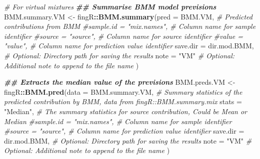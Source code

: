 \documentclass[
]{article}
\newenvironment{Shaded}{\begin{snugshade}}{\end{snugshade}}
\newcommand{\AttributeTok}[1]{\textcolor[rgb]{0.13,0.29,0.53}{#1}}
\newcommand{\CommentTok}[1]{\textcolor[rgb]{0.56,0.35,0.01}{\textit{#1}}}
\newcommand{\DocumentationTok}[1]{\textcolor[rgb]{0.56,0.35,0.01}{\textbf{\textit{#1}}}}
\newcommand{\FunctionTok}[1]{\textcolor[rgb]{0.13,0.29,0.53}{\textbf{#1}}}
\newcommand{\NormalTok}[1]{#1}
\newcommand{\OtherTok}[1]{\textcolor[rgb]{0.56,0.35,0.01}{#1}}
\newcommand{\SpecialCharTok}[1]{\textcolor[rgb]{0.81,0.36,0.00}{\textbf{#1}}}
\newcommand{\StringTok}[1]{\textcolor[rgb]{0.31,0.60,0.02}{#1}}
\begin{document}
\begin{Shaded}
\begin{Highlighting}[]
\CommentTok{\# For virtual mixtures}
\DocumentationTok{\#\# Summarise BMM model previsions}
\NormalTok{BMM.summary.VM }\OtherTok{\textless{}{-}}\NormalTok{ fingR}\SpecialCharTok{::}\FunctionTok{BMM.summary}\NormalTok{(}\AttributeTok{pred =}\NormalTok{ BMM.VM,              }\CommentTok{\# Predicted contributions from BMM}
                                     \CommentTok{\#sample.id = "mix.names",   \# Column name for sample identifier}
                                     \CommentTok{\#source = "source",         \# Column name for source identifier}
                                     \CommentTok{\#value = "value",           \# Column name for prediction value identifier}
                                     \AttributeTok{save.dir =}\NormalTok{ dir.mod.BMM,     }\CommentTok{\# Optional: Directory path for saving the results}
                                     \AttributeTok{note =} \StringTok{"VM"}                 \CommentTok{\# Optional: Additional note to append to the file name}
\NormalTok{                                     )}

\DocumentationTok{\#\# Extracts the median value of the previsions}
\NormalTok{BMM.preds.VM }\OtherTok{\textless{}{-}}\NormalTok{ fingR}\SpecialCharTok{::}\FunctionTok{BMM.pred}\NormalTok{(}\AttributeTok{data =}\NormalTok{ BMM.summary.VM,           }\CommentTok{\# Summary statistics of the predicted contribution by BMM, data from fingR::BMM.summary.mix}
                                \AttributeTok{stats =} \StringTok{"Median"}\NormalTok{,                }\CommentTok{\# The summary statistics for source contribution, Could be Mean or Median}
                                \CommentTok{\#sample.id = "mix.names",        \# Column name for sample identifier}
                                \CommentTok{\#source = "source",              \# Column name for prediction value identifier}
                                \AttributeTok{save.dir =}\NormalTok{ dir.mod.BMM,          }\CommentTok{\# Optional: Directory path for saving the results}
                                \AttributeTok{note =} \StringTok{"VM"}                      \CommentTok{\# Optional: Additional note to append to the file name}
\NormalTok{                                 )}


\end{Highlighting}
\end{Shaded}
\end{document}
